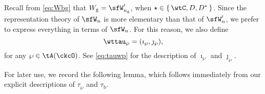 \documentclass[12pt,a4paper]{amsart}
\newcommand{\trivial}[2][]{\if\relax\detokenize{#1}\relax
  {%
      \color{orange} \vspace{0em} $[$  #2 $]$
      \color{black}
  }
  \else
\ifx#1h
\ifcsname showtrivial\endcsname
{%
    \color{orange} \vspace{0em}  $[$ #2 $]$
    \color{black}
}
\fi
\else {\red Wrong argument!} \fi
\fi
}
\numberwithin{equation}{section}
\theoremstyle{remark}
\newtheorem{remark}[thm]{Remark}
\def\dBV{d_{\mathrm{BV}}}
\def\Wg{W_{\mathrm g}}
\def\cuprow{{\stackrel{r}{\sqcup}}}
\def\cupcol{{\stackrel{c}{\sqcup}}}
\def\cuprow{{\,\stackrel{r}{\sqcup}\,}}
\def\cupcol{{\,\stackrel{c}{\sqcup}\,}}
\begin{document}


%

Recall from \eqref{eq:Wbg} that $\Wg =\sfW'_{n_{\mathrm g}}$, when $\star \in \set{\wtC,D,D^{*}}$. Since the representation theory of $\sfW_{n}$ is more elementary than that of
$\sfW'_{n}$, we prefer to express everything in terms of $\sfW_{n}$. For this reason, we also define
\begin{equation}\label{eq:ttauwp}
\wttau_{\wp} = (\imath_{\wp},\jmath_{\wp}),
\end{equation}
for any $\wp\in \tA(\ckcO)$. See \eqref{eq:tauwp} for the description of $\imath_{\wp}$ and $\jmath_{\wp}$.

For later use, we record the following lemma, which follows immediately from our explicit descriptions of $\tau_{\wp}$ and $\tau_{\mathrm b}$. 
\end{document}
